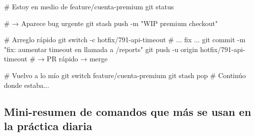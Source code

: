 \documentclass[
  doc,
  floatsintext,
  longtable,
  a4paper,
  nolmodern,
  notxfonts,
  notimes,
  12pt,
  colorlinks=true,linkcolor=blue,citecolor=blue,urlcolor=blue]{apa7}
\newenvironment{Shaded}{\begin{snugshade}}{\end{snugshade}}
\newcommand{\AttributeTok}[1]{\textcolor[rgb]{0.40,0.45,0.13}{#1}}
\newcommand{\CommentTok}[1]{\textcolor[rgb]{0.37,0.37,0.37}{#1}}
\newcommand{\FunctionTok}[1]{\textcolor[rgb]{0.28,0.35,0.67}{#1}}
\newcommand{\NormalTok}[1]{\textcolor[rgb]{0.00,0.23,0.31}{#1}}
\newcommand{\StringTok}[1]{\textcolor[rgb]{0.13,0.47,0.30}{#1}}
\begin{document}
\begin{Shaded}
\begin{Highlighting}[]
\CommentTok{\# Estoy en medio de feature/cuenta{-}premium}
\FunctionTok{git}\NormalTok{ status}

\CommentTok{\# → Aparece bug urgente}
\FunctionTok{git}\NormalTok{ stash push }\AttributeTok{{-}m} \StringTok{"WIP premium checkout"}

\CommentTok{\# Arreglo rápido}
\FunctionTok{git}\NormalTok{ switch }\AttributeTok{{-}c}\NormalTok{ hotfix/791{-}api{-}timeout}
\CommentTok{\# ... fix ...}
\FunctionTok{git}\NormalTok{ commit }\AttributeTok{{-}m} \StringTok{"fix: aumentar timeout en llamada a /reports"}
\FunctionTok{git}\NormalTok{ push }\AttributeTok{{-}u}\NormalTok{ origin hotfix/791{-}api{-}timeout}
\CommentTok{\# → PR rápido → merge}

\CommentTok{\# Vuelvo a lo mío}
\FunctionTok{git}\NormalTok{ switch feature/cuenta{-}premium}
\FunctionTok{git}\NormalTok{ stash pop}
\CommentTok{\# Continúo donde estaba...}
\end{Highlighting}
\end{Shaded}

\subsection{Mini-resumen de comandos que más se usan en la práctica
diaria}\label{mini-resumen-de-comandos-que-muxe1s-se-usan-en-la-pruxe1ctica-diaria}
\end{document}
